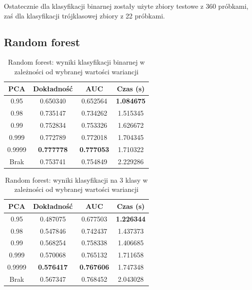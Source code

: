 \documentclass[a4paper, twoside, 11pt, openright]{article}
\begin{document}
Ostatecznie dla klasyfikacji binarnej zostały użyte zbiory testowe z 360 próbkami, zaś dla klasyfikacji trójklasowej zbiory z 22 próbkami.



\subsection{Random forest}

\begin{table}[H]
    \centering
    \begin{tabular}{|c|c|c|c|}
    \hline
        \textbf{PCA} & \textbf{Dokładność} & \textbf{AUC} & \textbf{Czas (s)} \\ \hline
0.95               &  0.650340 &  0.652564 &    \textbf{1.084675} \\ \hline
0.98               &  0.735147 &  0.734262 &    1.515345 \\ \hline
0.99               &  0.752834 &  0.753326 &    1.626672 \\ \hline
0.999 &  0.772789 &  0.772018 &    1.704345 \\ \hline
0.9999             &  \textbf{0.777778} &  \textbf{0.777053} &    1.710322 \\ \hline
Brak                &  0.753741 &  0.754849 &    2.229286 \\ \hline
    \end{tabular}
    \caption{Random forest: wyniki klasyfikacji binarnej w zależności od wybranej wartości wariancji}
    \label{tab:rf_pca_binary}
\end{table}
\begin{table}[H]
    \centering
    \begin{tabular}{|c|c|c|c|}
    \hline
        \textbf{PCA} & \textbf{Dokładność} & \textbf{AUC} & \textbf{Czas (s)} \\ \hline
0.95               &  0.487075 &  0.677503 &    \textbf{1.226344} \\ \hline
0.98               &  0.547846 &  0.742437 &    1.437373 \\ \hline
0.99               &  0.568254 &  0.758338 &    1.406685 \\ \hline
0.999 &  0.570068 &  0.765132 &    1.711658 \\ \hline
0.9999             &  \textbf{0.576417} &  \textbf{0.767606} &    1.747348 \\ \hline
Brak                &  0.567347 &  0.768452 &    2.043028 \\ \hline
    \end{tabular}
    \caption{Random forest: wyniki klasyfikacji na 3 klasy w zależności od wybranej wartości wariancji}
    \label{tab:rf_pca_discrete}
\end{table}
\end{document}

